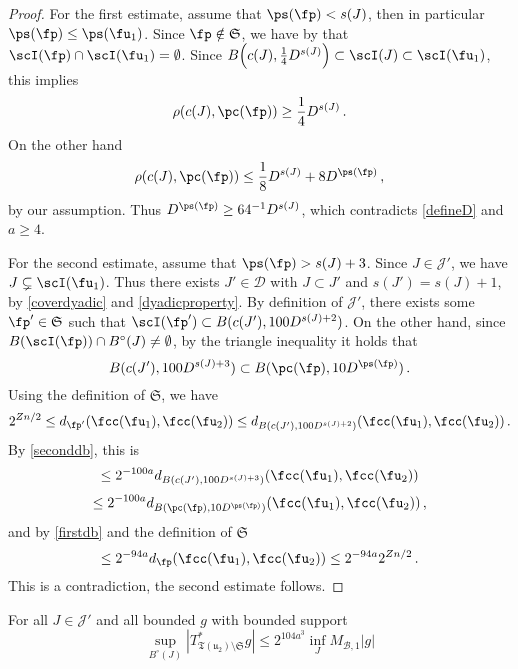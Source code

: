     \begin{proof}
        \leanok
        For the first estimate, assume that $\ps(\fp) < s(J)$, then in particular $\ps(\fp) \le \ps(\fu_1)$. Since $\fp \notin \mathfrak{S}$, we have by  that $\scI(\fp) \cap \scI(\fu_1) = \emptyset$.
        Since $B\Big(c(J), \frac{1}{4} D^{s(J)}\Big) \subset \scI(J) \subset \scI(\fu_1)$, this implies
        $$
            \rho(c(J), \pc(\fp)) \ge \frac{1}{4}D^{s(J)}\,.
        $$
        On the other hand
        $$
            \rho(c(J), \pc(\fp)) \le \frac{1}{8} D^{s(J)} + 8 D^{\ps(\fp)}\,,
        $$
        by our assumption. Thus $D^{\ps(\fp)} \ge 64^{-1} D^{s(J)}$, which contradicts \eqref{defineD} and $a \ge 4$.

        For the second estimate, assume that $\ps(\fp) > s(J) + 3$. Since $J \in \mathcal{J}'$, we have $J \subsetneq \scI(\fu_1)$. Thus there exists $J' \in \mathcal{D}$ with $J \subset J'$ and $s(J') = s(J) + 1$, by \eqref{coverdyadic} and \eqref{dyadicproperty}. By definition of $\mathcal{J}'$, there exists some $\fp' \in \mathfrak{S}$ such that $\scI(\fp') \subset B(c(J'), 100 D^{s(J) + 2})$. On the other hand, since $B(\scI(\fp)) \cap B^\circ(J) \ne \emptyset$, by the triangle inequality it holds that
        $$
            B(c(J'), 100 D^{s(J) + 3}) \subset B(\pc(\fp), 10 D^{\ps(\fp)})\,.
        $$
        Using the definition of $\mathfrak{S}$, we have
        $$
            2^{Zn/2} \le d_{\fp'}(\fcc(\fu_1), \fcc(\fu_2)) \le d_{B(c(J'), 100 D^{s(J) + 2})}(\fcc(\fu_1), \fcc(\fu_2))\,.
        $$
        By \eqref{seconddb}, this is
        $$
            \le 2^{-100a} d_{B(c(J'), 100 D^{s(J) + 3})}(\fcc(\fu_1), \fcc(\fu_2))
        $$
        $$
            \le 2^{-100a} d_{B(\pc(\fp), 10 D^{\ps(\fp)})}(\fcc(\fu_1), \fcc(\fu_2))\,,
        $$
        and by \eqref{firstdb} and the definition of $\mathfrak{S}$
        $$
            \le 2^{-94a} d_{\fp}(\fcc(\fu_1), \fcc(\fu_2)) \le 2^{-94a} 2^{Zn/2}\,.
        $$
        This is a contradiction, the second estimate follows.
    \end{proof}


    \begin{lemma}
        \label{local-tree-control}
        \leanok
        For all $J \in \mathcal{J}'$ and all bounded $g$ with bounded support
        $$
            \sup_{B^\circ{}(J)} |T_{\mathfrak{T}(\mathfrak{u}_2)\setminus\mathfrak{S}}^* g| \le 2^{104a^3} \inf_J M_{\mathcal{B},1}|g|
        $$
    \end{lemma}

